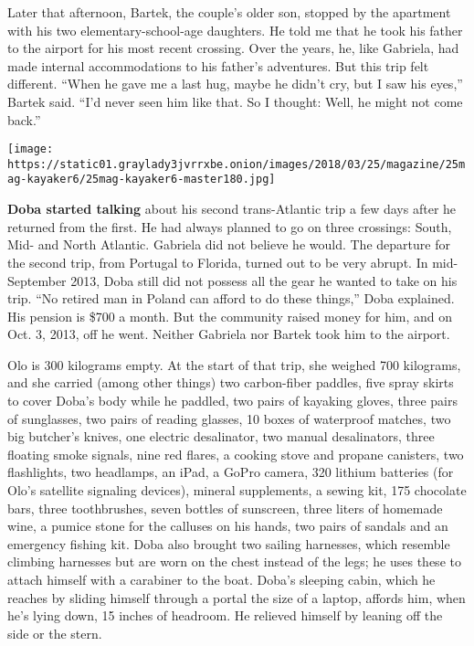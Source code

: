 Later that afternoon, Bartek, the couple's older son, stopped by the
apartment with his two elementary-school-age daughters. He told me that
he took his father to the airport for his most recent crossing. Over the
years, he, like Gabriela, had made internal accommodations to his
father's adventures. But this trip felt different. ``When he gave me a
last hug, maybe he didn't cry, but I saw his eyes,'' Bartek said. ``I'd
never seen him like that. So I thought: Well, he might not come back.''

\texttt{[image: https://static01.graylady3jvrrxbe.onion/images/2018/03/25/magazine/25mag-kayaker6/25mag-kayaker6-master180.jpg]}

\textbf{Doba started talking} about his second trans-Atlantic trip a few
days after he returned from the first. He had always planned to go on
three crossings: South, Mid- and North Atlantic. Gabriela did not
believe he would. The departure for the second trip, from Portugal to
Florida, turned out to be very abrupt. In mid-September 2013, Doba still
did not possess all the gear he wanted to take on his trip. ``No retired
man in Poland can afford to do these things,'' Doba explained. His
pension is \$700 a month. But the community raised money for him, and on
Oct. 3, 2013, off he went. Neither Gabriela nor Bartek took him to the
airport.

Olo is 300 kilograms empty. At the start of that trip, she weighed 700
kilograms, and she carried (among other things) two carbon-fiber
paddles, five spray skirts to cover Doba's body while he paddled, two
pairs of kayaking gloves, three pairs of sunglasses, two pairs of
reading glasses, 10 boxes of waterproof matches, two big butcher's
knives, one electric desalinator, two manual desalinators, three
floating smoke signals, nine red flares, a cooking stove and propane
canisters, two flashlights, two headlamps, an iPad, a GoPro camera, 320
lithium batteries (for Olo's satellite signaling devices), mineral
supplements, a sewing kit, 175 chocolate bars, three toothbrushes, seven
bottles of sunscreen, three liters of homemade wine, a pumice stone for
the calluses on his hands, two pairs of sandals and an emergency fishing
kit. Doba also brought two sailing harnesses, which resemble climbing
harnesses but are worn on the chest instead of the legs; he uses these
to attach himself with a carabiner to the boat. Doba's sleeping cabin,
which he reaches by sliding himself through a portal the size of a
laptop, affords him, when he's lying down, 15 inches of headroom. He
relieved himself by leaning off the side or the stern.

